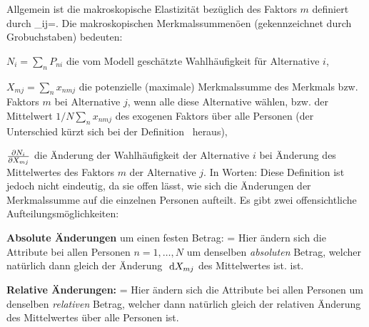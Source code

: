 Allgemein ist die makroskopische Elastizit\"at bez\"uglich des Faktors
$m$ definiert durch
\be
\label{elast-mac}
\epsilon_{ij}=.
\ee
Die makroskopischen Merkmalssummen\"o\3en (gekennzeichnet durch Gro\3buchstaben)
bedeuten:
\bi
\item $N_i=\sum_nP_{ni}$ die vom Modell
  gesch\"atzte Wahlh\"aufigkeit f\"ur Alternative $i$,
\item $X_{mj}=\sum_nx_{nmj}$ die potenzielle (maximale)
  Merkmalssumme des Merkmals bzw. Faktors  $m$ bei Alternative $j$,
  wenn alle diese Alternative w\"ahlen, bzw. der Mittelwert $1/N
  \sum_nx_{nmj}$ des exogenen Faktors \"uber alle Personen (der Unterschied
  k\"urzt sich bei der Definition~ heraus), 
\item $\frac{\partial N_i}{\partial X_{mj}}$ die \"Anderung der Wahlh\"aufigkeit der Alternative
  $i$ bei \"Anderung des Mittelwertes des Faktors $m$ der
  Alternative $j$.
\ei
In Worten:
Diese Definition ist jedoch nicht eindeutig, da sie offen l\"asst, wie
sich die \"Anderungen der Merkmalssumme auf die einzelnen Personen
aufteilt. Es gibt zwei offensichtliche
Aufteilungsm\"oglichkeiten:
\bi
\item \textbf{Absolute \"Anderungen} um einen festen Betrag:
\be
\label{auftAbs}
=
\ee
Hier \"andern sich die Attribute bei allen Personen $n=1, \ldots, N$ um denselben
\emph{absoluten} Betrag, welcher nat\"urlich dann gleich der \"Anderung $\ \textrm{d} X_{mj}$
des Mittelwertes ist.
ist.  
\item \textbf{Relative \"Anderungen:}
\be
\label{auftRel}
=
\ee
Hier \"andern sich die Attribute bei allen Personen um denselben
\emph{relativen} Betrag, welcher dann nat\"urlich gleich der relativen
\"Anderung des Mittelwertes \"uber alle Personen ist.
\ei

